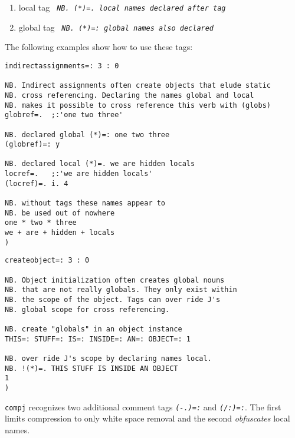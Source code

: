 \begin{enumerate}
	\item local tag \textcolor{CodeComment}{\texttt{\textsl{ NB. (*)=. local names declared after tag}}}
	\item global tag \textcolor{CodeComment}{\texttt{\textsl{ NB. (*)=: global names also declared}}}
\end{enumerate}
  
   The following examples show how to use these tags:

\begin{lstlisting}[frame=single,framerule=0pt]  
indirectassignments=: 3 : 0

NB. Indirect assignments often create objects that elude static 
NB. cross referencing. Declaring the names global and local 
NB. makes it possible to cross reference this verb with (globs) 
globref=.  ;:'one two three'

NB. declared global (*)=: one two three
(globref)=: y     

NB. declared local (*)=. we are hidden locals
locref=.   ;:'we are hidden locals'
(locref)=. i. 4  

NB. without tags these names appear to
NB. be used out of nowhere 
one * two * three
we + are + hidden + locals
)
\end{lstlisting}

     
\begin{lstlisting}[frame=single,framerule=0pt]    
createobject=: 3 : 0

NB. Object initialization often creates global nouns
NB. that are not really globals. They only exist within
NB. the scope of the object. Tags can over ride J's 
NB. global scope for cross referencing.

NB. create "globals" in an object instance
THIS=: STUFF=: IS=: INSIDE=: AN=: OBJECT=: 1

NB. over ride J's scope by declaring names local.
NB. !(*)=. THIS STUFF IS INSIDE AN OBJECT
1
)
\end{lstlisting}

 \texttt{compj} recognizes two additional comment tags \textcolor{CodeComment}{\texttt{\textsl{(-.)=:}}}
 and \textcolor{CodeComment}{\texttt{\textsl{(/:)=:}}}. The first limits compression to only white space removal
 and the second \emph{obfuscates} local names.
 
